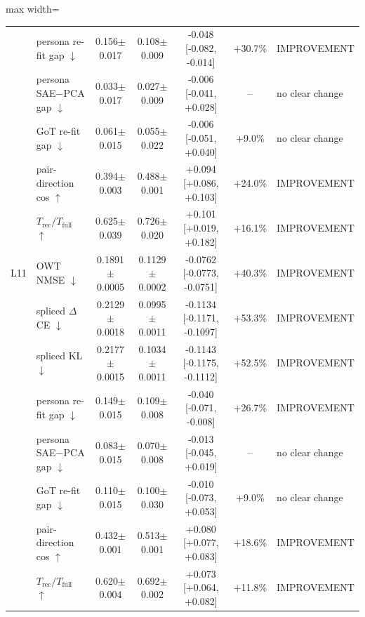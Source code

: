 \begin{table}[t]
\begin{adjustbox}{max width=\linewidth}
\begin{tabular}{llccccl}
 & persona re-fit gap $\downarrow$ & 0.156$\pm$0.017 & 0.108$\pm$0.009 & -0.048 [-0.082, -0.014] & +30.7\% & IMPROVEMENT \\
 & persona SAE$-$PCA gap $\downarrow$ & 0.033$\pm$0.017 & 0.027$\pm$0.009 & -0.006 [-0.041, +0.028] & -- & no clear change \\
 & GoT re-fit gap $\downarrow$ & 0.061$\pm$0.015 & 0.055$\pm$0.022 & -0.006 [-0.051, +0.040] & +9.0\% & no clear change \\
 & pair-direction cos $\uparrow$ & 0.394$\pm$0.003 & 0.488$\pm$0.001 & +0.094 [+0.086, +0.103] & +24.0\% & IMPROVEMENT \\
 & $T_{\text{rec}}/T_{\text{full}}$ $\uparrow$ & 0.625$\pm$0.039 & 0.726$\pm$0.020 & +0.101 [+0.019, +0.182] & +16.1\% & IMPROVEMENT \\
\midrule
L11 & OWT NMSE $\downarrow$ & 0.1891$\pm$0.0005 & 0.1129$\pm$0.0002 & -0.0762 [-0.0773, -0.0751] & +40.3\% & IMPROVEMENT \\
 & spliced $\Delta$CE $\downarrow$ & 0.2129$\pm$0.0018 & 0.0995$\pm$0.0011 & -0.1134 [-0.1171, -0.1097] & +53.3\% & IMPROVEMENT \\
 & spliced KL $\downarrow$ & 0.2177$\pm$0.0015 & 0.1034$\pm$0.0011 & -0.1143 [-0.1175, -0.1112] & +52.5\% & IMPROVEMENT \\
 & persona re-fit gap $\downarrow$ & 0.149$\pm$0.015 & 0.109$\pm$0.008 & -0.040 [-0.071, -0.008] & +26.7\% & IMPROVEMENT \\
 & persona SAE$-$PCA gap $\downarrow$ & 0.083$\pm$0.015 & 0.070$\pm$0.008 & -0.013 [-0.045, +0.019] & -- & no clear change \\
 & GoT re-fit gap $\downarrow$ & 0.110$\pm$0.015 & 0.100$\pm$0.030 & -0.010 [-0.073, +0.053] & +9.0\% & no clear change \\
 & pair-direction cos $\uparrow$ & 0.432$\pm$0.001 & 0.513$\pm$0.001 & +0.080 [+0.077, +0.083] & +18.6\% & IMPROVEMENT \\
 & $T_{\text{rec}}/T_{\text{full}}$ $\uparrow$ & 0.620$\pm$0.004 & 0.692$\pm$0.002 & +0.073 [+0.064, +0.082] & +11.8\% & IMPROVEMENT \\
\bottomrule
\end{tabular}
\end{adjustbox}
\end{table}
